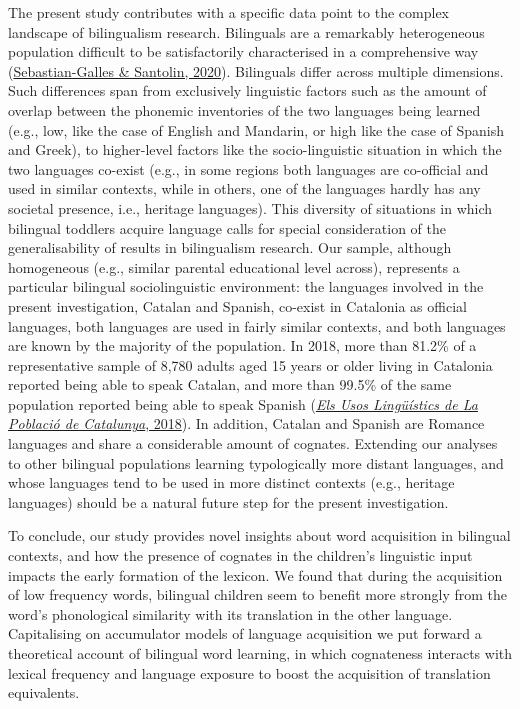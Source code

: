\documentclass[
]{article}
\begin{document}
The present study contributes with a specific data point to the complex
landscape of bilingualism research. Bilinguals are a remarkably
heterogeneous population difficult to be satisfactorily characterised in
a comprehensive way
(\protect\hyperlink{ref-sebastian-galles2020bilingual}{Sebastian-Galles
\& Santolin, 2020}). Bilinguals differ across multiple dimensions. Such
differences span from exclusively linguistic factors such as the amount
of overlap between the phonemic inventories of the two languages being
learned (e.g., low, like the case of English and Mandarin, or high like
the case of Spanish and Greek), to higher-level factors like the
socio-linguistic situation in which the two languages co-exist (e.g., in
some regions both languages are co-official and used in similar
contexts, while in others, one of the languages hardly has any societal
presence, i.e., heritage languages). This diversity of situations in
which bilingual toddlers acquire language calls for special
consideration of the generalisability of results in bilingualism
research. Our sample, although homogeneous (e.g., similar parental
educational level across), represents a particular bilingual
sociolinguistic environment: the languages involved in the present
investigation, Catalan and Spanish, co-exist in Catalonia as official
languages, both languages are used in fairly similar contexts, and both
languages are known by the majority of the population. In 2018, more
than 81.2\% of a representative sample of 8,780 adults aged 15 years or
older living in Catalonia reported being able to speak Catalan, and more
than 99.5\% of the same population reported being able to speak Spanish
(\protect\hyperlink{ref-2018els}{\emph{Els Usos Lingüístics de La
Població de Catalunya}, 2018}). In addition, Catalan and Spanish are
Romance languages and share a considerable amount of cognates. Extending
our analyses to other bilingual populations learning typologically more
distant languages, and whose languages tend to be used in more distinct
contexts (e.g., heritage languages) should be a natural future step for
the present investigation.

To conclude, our study provides novel insights about word acquisition in
bilingual contexts, and how the presence of cognates in the children's
linguistic input impacts the early formation of the lexicon. We found
that during the acquisition of low frequency words, bilingual children
seem to benefit more strongly from the word's phonological similarity
with its translation in the other language. Capitalising on accumulator
models of language acquisition we put forward a theoretical account of
bilingual word learning, in which cognateness interacts with lexical
frequency and language exposure to boost the acquisition of translation
equivalents.
\end{document}
